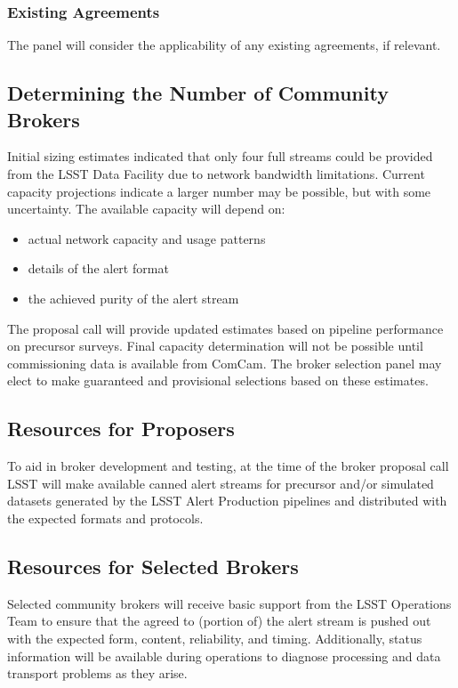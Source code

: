 \subsubsection{Existing Agreements}

The panel will consider the applicability of any existing agreements, if relevant.

\subsection{Determining the Number of Community Brokers} \label{sec:numbrokers}

Initial sizing estimates indicated that only four full streams could be provided from the LSST Data Facility due to network bandwidth limitations.  
Current capacity projections indicate a larger number may be possible, but with some uncertainty.
The available capacity will depend on:

\begin{itemize}
	\item actual network capacity and usage patterns
	\item details of the alert format
	\item the achieved purity of the alert stream
\end{itemize}

The proposal call will provide updated estimates based on pipeline performance on precursor surveys.
Final capacity determination will not be possible until commissioning data is available from ComCam.
The broker selection panel may elect to make guaranteed and provisional selections based on these estimates.

\subsection{Resources for Proposers}

To aid in broker development and testing, at the time of the broker proposal call LSST will make available canned alert streams for precursor and/or simulated datasets generated by the LSST Alert Production pipelines and distributed with the expected formats and protocols.

\subsection{Resources for Selected Brokers}

Selected community brokers will receive basic support from the LSST Operations Team to ensure that the agreed to (portion of) the alert stream is pushed out with the expected form, content, reliability, and timing.
Additionally, status information will be available during operations to diagnose processing and data transport problems as they arise.

